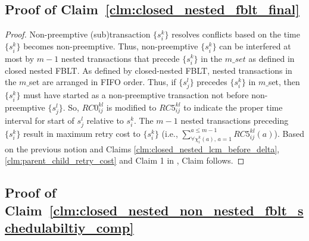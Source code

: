\documentclass[letter]{sig-alternate}
\begin{document}
\subsection{\label{proof_clm:closed_nested_fblt_final}Proof of Claim~\ref{clm:closed_nested_fblt_final}}

\begin{proof}

Non-preemptive (sub)transaction $\{s_{i}^{k}\}$ resolves conflicts
based on the time $\{s_{i}^{k}\}$ becomes non-preemptive. Thus, non-preemptive
$\{s_{i}^{k}\}$ can be interfered at most by $m-1$ nested transactions
that precede $\{s_{i}^{k}\}$ in the $m\_set$ as defined in closed
nested FBLT. As defined by closed-nested FBLT, nested transactions
in the $m\_$set are arranged in FIFO order. Thus, if $\{s_{j}^{l}\}$
precedes $\{s_{i}^{k}\}$ in $m\_$set, then $\{s_{i}^{k}\}$ must
have started as a non-preemptive transaction not before non-preemptive
$\{s_{j}^{l}\}$. So, $RC0_{ij}^{kl}$ is modified to $RC5_{ij}^{kl}$
to indicate the proper time interval for start of $s_{j}^{l}$ relative
to $s_{i}^{k}$. The $m-1$ nested transactions preceding $\{s_{i}^{k}\}$
result in maximum retry cost to $\{s_{i}^{k}\}$ (i.e., $\sum_{\forall\chi_{i}^{k}(a),\, a=1}^{a\le m-1}RC5_{ij}^{kl}(a)$).
Based on the previous notion and Claims \ref{clm:closed_nested_lcm_before_delta},
\ref{clm:parent_child_retry_cost} and Claim 1 in \cite{fblt}, Claim
follows.

\end{proof}

\subsection{\label{proof_clm:closed_nested_non_nested_fblt_schedulabiltiy_comp}Proof of Claim~\ref{clm:closed_nested_non_nested_fblt_schedulabiltiy_comp}}
\end{document}

